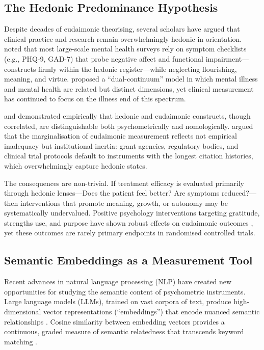 \documentclass[12pt,a4paper]{article}
\begin{document}
\subsection{The Hedonic Predominance Hypothesis}

Despite decades of eudaimonic theorising, several scholars have argued that clinical practice and research remain overwhelmingly hedonic in orientation.
\citet{huppert2009exploring} noted that most large-scale mental health surveys rely on symptom checklists (e.g., PHQ-9, GAD-7) that probe negative affect and functional impairment---constructs firmly within the hedonic register---while neglecting flourishing, meaning, and virtue.
\citet{keyes2002mental} proposed a ``dual-continuum'' model in which mental illness and mental health are related but distinct dimensions, yet clinical measurement has continued to focus on the illness end of this spectrum.

\citet{kashdan2008reconsidering} and \citet{disabato2016different} demonstrated empirically that hedonic and eudaimonic constructs, though correlated, are distinguishable both psychometrically and nomologically.
\citet{vittersø2016handbook} argued that the marginalisation of eudaimonic measurement reflects not empirical inadequacy but institutional inertia: grant agencies, regulatory bodies, and clinical trial protocols default to instruments with the longest citation histories, which overwhelmingly capture hedonic states.

The consequences are non-trivial.
If treatment efficacy is evaluated primarily through hedonic lenses---Does the patient feel better? Are symptoms reduced?---then interventions that promote meaning, growth, or autonomy may be systematically undervalued.
Positive psychology interventions targeting gratitude, strengths use, and purpose have shown robust effects on eudaimonic outcomes
\citep{seligman2005positive, sin2009enhancing},
yet these outcomes are rarely primary endpoints in randomised controlled trials.

\subsection{Semantic Embeddings as a Measurement Tool}

Recent advances in natural language processing (NLP) have created new opportunities for studying the semantic content of psychometric instruments.
Large language models (LLMs), trained on vast corpora of text, produce high-dimensional vector representations (``embeddings'') that encode nuanced semantic relationships
\citep{mikolov2013distributed, devlin2019bert, brown2020language}.
Cosine similarity between embedding vectors provides a continuous, graded measure of semantic relatedness that transcends keyword matching
\citep{pennington2014glove}.
\end{document}
